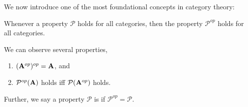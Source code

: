 We now introduce one of the most foundational concepts in
category theory:

\begin{framed}
\begin{dual}
\label{dualityPrinciple}
Whenever a property $\mathcal{P}$ holds for all categories, then
the property $\mathcal{P}^{op}$ holds for all categories.
\end{dual}
\end{framed}

We can observe several properties,
\begin{enumerate}
\item $(\mathbf{A}^{op})^{op}=\mathbf{A}$, and
\item $\mathcal{P}^{op}(\mathbf{A})$ holds iff $\mathcal{P}(\mathbf{A}^{op})$ holds.
\end{enumerate}
Further, we say a property $\mathcal{P}$ is  if
$\mathcal{P}^{op}=\mathcal{P}$.
